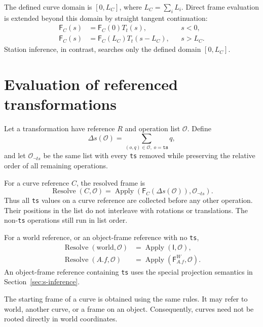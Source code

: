 \documentclass[11pt,a4paper]{article}
\newcommand{\Frame}{\mathsf{F}}
\newcommand{\Apply}{\operatorname{Apply}}
\newcommand{\ops}{\mathcal{O}}
\newcommand{\identity}{\mathsf{I}}
\begin{document}
The defined curve domain is $[0,L_C]$, where $L_C=\sum_iL_i$.  Direct frame
evaluation is extended beyond this domain by straight tangent continuation:
\begin{align}
  \Frame_C(s)&=\Frame_C(0)T_t(s), &&s<0,\\
  \Frame_C(s)&=\Frame_C(L_C)T_t(s-L_C), &&s>L_C.
  \label{eq:curve-extrapolation}
\end{align}
Station inference, in contrast, searches only the defined domain
$[0,L_C]$.

\section{Evaluation of referenced transformations}
\label{sec:reference-transform}

Let a transformation have reference $R$ and operation list $\ops$.  Define
\begin{equation}
  \Delta s(\ops)=\sum_{(o,q)\in\ops,\;o=\texttt{ts}}q,
\end{equation}
and let $\ops_{\neg ts}$ be the same list with every \texttt{ts} removed while
preserving the relative order of all remaining operations.

For a curve reference $C$, the resolved frame is
\begin{equation}
  \operatorname{Resolve}(C,\ops)
  =\Apply\!\left(\Frame_C(\Delta s(\ops)),\ops_{\neg ts}\right).
  \label{eq:curve-reference}
\end{equation}
Thus all \texttt{ts} values on a curve reference are collected before any
other operation.  Their positions in the list do not interleave with rotations
or translations.  The non-\texttt{ts} operations still run in list order.

For a world reference, or an object-frame reference with no \texttt{ts},
\begin{align}
  \operatorname{Resolve}(\text{world},\ops)
    &=\Apply(\identity,\ops),\\
  \operatorname{Resolve}(A.f,\ops)
    &=\Apply(\Frame_{A.f}^{W},\ops).
  \label{eq:ordinary-reference}
\end{align}
An object-frame reference containing \texttt{ts} uses the special projection
semantics in Section~\ref{sec:s-inference}.

The starting frame of a curve is obtained using the same rules.  It may refer
to world, another curve, or a frame on an object.  Consequently, curves need
not be rooted directly in world coordinates.
\end{document}
